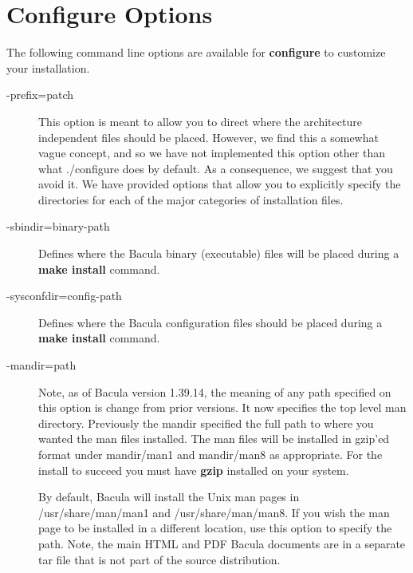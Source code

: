 \section{Configure Options}
\label{Options}

The following command line options are available for {\bf configure} to
customize your installation. 

\begin{description}
\item [ \--prefix=\lt{}patch\gt{}]
   This option is meant to allow you to direct where the architecture
   independent files should be placed.  However, we find this a somewhat
   vague concept, and so we have not implemented this option other than
   what ./configure does by default.  As a consequence, we suggest that
   you avoid it. We have provided options that allow you to explicitly
   specify the directories for each of the major categories of installation
   files.
\item [ {-}{\-}sbindir=\lt{}binary-path\gt{}]
   Defines where the Bacula  binary (executable) files will be placed during a
   {\bf make  install} command.  

\item [ {-}{\-}sysconfdir=\lt{}config-path\gt{}]
   Defines where the Bacula configuration files should be placed during a
   {\bf make install} command.

\item [ {-}{\-}mandir=\lt{}path\gt{}]
   Note, as of Bacula version 1.39.14, the meaning of any path
   specified on this option is change from prior versions. It
   now specifies the top level man directory.
   Previously the mandir specified the full path to where you
   wanted the man files installed.
   The man files will be installed in gzip'ed format under
   mandir/man1 and mandir/man8 as appropriate.
   For the install to succeed you must have {\bf gzip} installed
   on your system.

   By default, Bacula will install the Unix man pages in 
   /usr/share/man/man1 and /usr/share/man/man8.  
   If you wish the man page to be installed in
   a different location, use this option to specify the path.
   Note, the main HTML and PDF Bacula documents are in a separate
   tar file that is not part of the source distribution.


\end{description}
